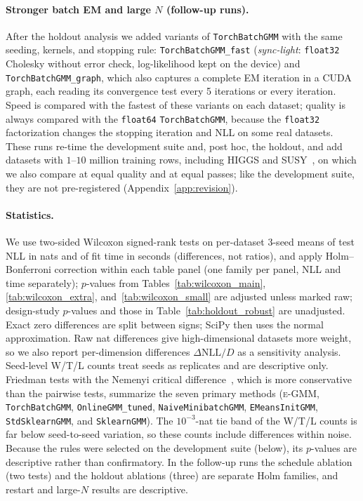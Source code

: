 \documentclass[10pt]{article} %
\newcommand{\egmm}{\textsc{e-GMM}}
\begin{document}
\paragraph{Stronger batch EM and large $N$ (follow-up runs).} After the holdout analysis we added variants of \texttt{TorchBatchGMM} with the same seeding, kernels, and stopping rule: \texttt{TorchBatchGMM\_fast} (\emph{sync-light}: \texttt{float32} Cholesky without error check, log-likelihood kept on the device) and \texttt{TorchBatchGMM\_graph}, which also captures a complete EM iteration in a CUDA graph, each reading its convergence test every 5 iterations or every iteration. Speed is compared with the fastest of these variants on each dataset; quality is always compared with the \texttt{float64} \texttt{TorchBatchGMM}, because the \texttt{float32} factorization changes the stopping iteration and NLL on some real datasets. These runs re-time the development suite and, post hoc, the holdout, and add \rSnLg{} datasets with $1$--$10$ million training rows, including HIGGS and SUSY~\citep{baldi2014searching}, on which we also compare at equal quality and at equal passes; like the development suite, they are not pre-registered (Appendix~\ref{app:revision}).

\paragraph{Statistics.} We use two-sided Wilcoxon signed-rank tests on per-dataset 3-seed means of test NLL in nats and of fit time in seconds (differences, not ratios), and apply Holm--Bonferroni correction within each table panel (one family per panel, NLL and time separately); $p$-values from Tables~\ref{tab:wilcoxon_main}, \ref{tab:wilcoxon_extra}, and~\ref{tab:wilcoxon_small} are adjusted unless marked raw; design-study $p$-values and those in Table~\ref{tab:holdout_robust} are unadjusted. Exact zero differences are split between signs; SciPy then uses the normal approximation. Raw nat differences give high-dimensional datasets more weight, so we also report per-dimension differences $\Delta\mathrm{NLL}/D$ as a sensitivity analysis. Seed-level W/T/L counts treat seeds as replicates and are descriptive only. Friedman tests with the Nemenyi critical difference~\citep{demsar2006statistical}, which is more conservative than the pairwise tests, summarize the seven primary methods (\egmm{}, \texttt{TorchBatchGMM}, \texttt{OnlineGMM\_tuned}, \texttt{NaiveMinibatchGMM}, \texttt{EMeansInitGMM}, \texttt{StdSklearnGMM}, and \texttt{SklearnGMM}). The $10^{-3}$-nat tie band of the W/T/L counts is far below seed-to-seed variation, so these counts include differences within noise. Because the rules were selected on the development suite (below), its $p$-values are descriptive rather than confirmatory. In the follow-up runs the schedule ablation (two tests) and the holdout ablations (three) are separate Holm families, and restart and large-$N$ results are descriptive.
\end{document}
